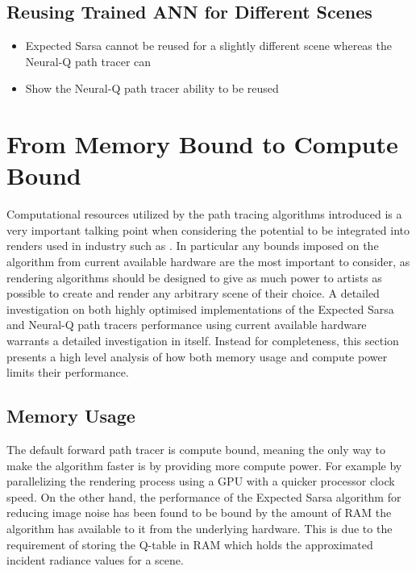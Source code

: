 \documentclass[../dissertation.tex]{subfiles}
\begin{document}
\subsection{Reusing Trained ANN for Different Scenes}
\begin{itemize}
\item Expected Sarsa cannot be reused for a slightly different scene whereas the Neural-Q path tracer can 
\item Show the Neural-Q path tracer ability to be reused
\end{itemize}


\section{From Memory Bound to Compute Bound}

Computational resources utilized by the path tracing algorithms introduced is a very important talking point when considering the potential to be integrated into renders used in industry such as \cite{georgiev2018arnold, christensen2018renderman, hyperion}. In particular any bounds imposed on the algorithm from current available hardware are the most important to consider, as rendering algorithms should be designed to give as much power to artists as possible to create and render any arbitrary scene of their choice. A detailed investigation on both highly optimised implementations of the Expected Sarsa and Neural-Q path tracers performance using current available hardware warrants a detailed investigation in itself. Instead for completeness, this section presents a high level analysis of how both memory usage and compute power limits their performance.

\subsection{Memory Usage}

The default forward path tracer is compute bound, meaning the only way to make the algorithm faster is by providing more compute power. For example by parallelizing the rendering process using a GPU with a quicker processor clock speed. On the other hand, the performance of the Expected Sarsa algorithm for reducing image noise has been found to be bound by the amount of RAM the algorithm has available to it from the  underlying hardware. This is due to the requirement of storing the Q-table in RAM which holds the approximated incident radiance values for a scene.\\
\end{document}
